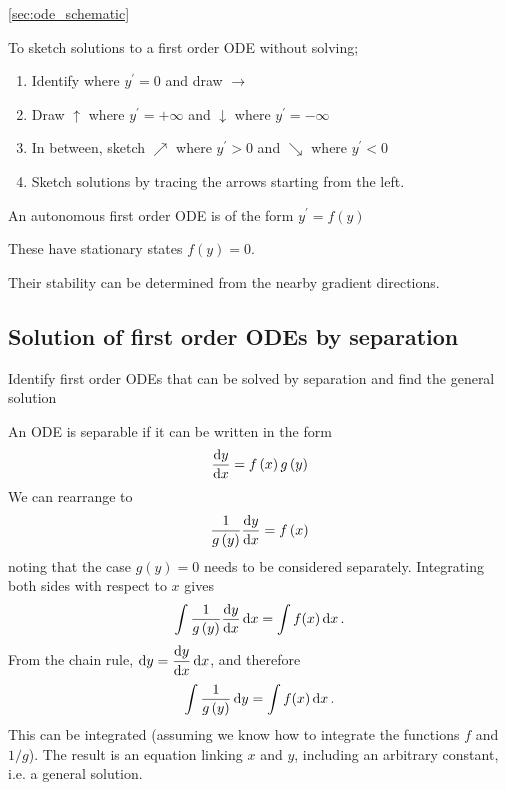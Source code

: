 \begin{recap}{\ref{sec:ode_schematic}}

\item To sketch solutions to a first order ODE without solving;
\begin{enumerate}

\item Identify where ${y}^{\prime }=0$ and draw $\rightarrow$

\item Draw $\uparrow$ where ${y}^{\prime }=+\infty $ and $\downarrow$ where ${y}^{\prime }=-\infty $

\item In between, sketch $\nearrow$ where ${y}^{\prime }>0$ and $\searrow$ where ${y}^{\prime }<0$

\item Sketch solutions by tracing the arrows starting from the left.

\end{enumerate}
\item An autonomous first order ODE is of the form ${y}^{\prime }=f\left(y\right)$

\item These have stationary states $f\left(y\right)=0$.

\item Their stability can be determined from the nearby gradient directions.

\end{recap}


\newtexpage
\subsection{Solution of first order ODEs by separation}
\label{sec:ode_separation}

\begin{learningoutcomes}
\item Identify first order ODEs that can be solved by separation and find the general solution
\end{learningoutcomes}


An ODE is separable if it can be written in the form
\[
\frac{{\rm d} y}{{\rm d} x}=f\left(x\right)g\left(y\right)
\]
We can rearrange to
\[
\frac{1}{g\left(y\right)}\frac{{\rm d} y}{{\rm d} x}=f\left(x\right)
\]
noting that the case $g(y)=0$ needs to be considered separately. Integrating both sides with respect to $x$ gives
\[
\int \frac{1}{g\left(y\right)}\frac{{\rm d} y}{{\rm d} x}\, {\rm d}x=\int f(x) \, {\rm d}x \, .
\]
From the chain rule, $\displaystyle {\rm d}y=\frac{{\rm d} y}{{\rm d} x}\, {\rm d}x$, and therefore
\[
\int \frac{1}{g\left(y\right)}\, {\rm d}y=\int f(x)\, {\rm d}x \, .
\]
This can be integrated (assuming we know how to integrate the functions $f$ and $1/g$). The result is an equation linking $x$ and $y$, including an arbitrary constant, i.e. a general solution.

